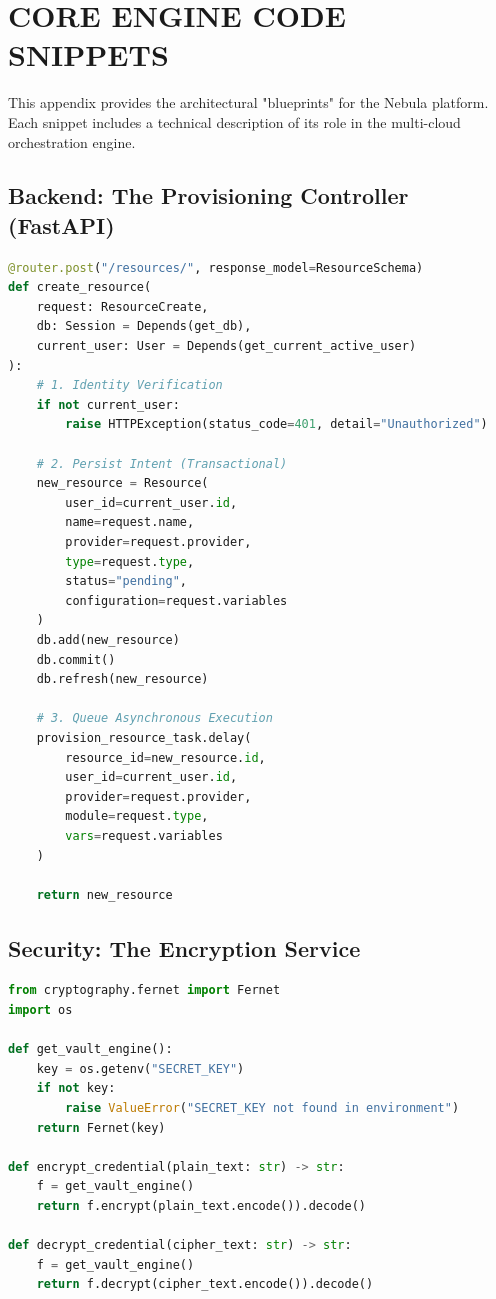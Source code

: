 \chapter{CORE ENGINE CODE SNIPPETS}

This appendix provides the architectural "blueprints" for the Nebula platform. Each snippet includes a technical description of its role in the multi-cloud orchestration engine.

\section{Backend: The Provisioning Controller (FastAPI)}
\begin{lstlisting}[language=Python, caption=Full Provisioning Router]
@router.post("/resources/", response_model=ResourceSchema)
def create_resource(
    request: ResourceCreate, 
    db: Session = Depends(get_db), 
    current_user: User = Depends(get_current_active_user)
):
    # 1. Identity Verification
    if not current_user:
        raise HTTPException(status_code=401, detail="Unauthorized")

    # 2. Persist Intent (Transactional)
    new_resource = Resource(
        user_id=current_user.id,
        name=request.name,
        provider=request.provider,
        type=request.type,
        status="pending",
        configuration=request.variables
    )
    db.add(new_resource)
    db.commit()
    db.refresh(new_resource)

    # 3. Queue Asynchronous Execution
    provision_resource_task.delay(
        resource_id=new_resource.id,
        user_id=current_user.id,
        provider=request.provider,
        module=request.type,
        vars=request.variables
    )
    
    return new_resource
\end{lstlisting}

\section{Security: The Encryption Service}
\begin{lstlisting}[language=Python, caption=AES-128 Fernet Implementation]
from cryptography.fernet import Fernet
import os

def get_vault_engine():
    key = os.getenv("SECRET_KEY")
    if not key:
        raise ValueError("SECRET_KEY not found in environment")
    return Fernet(key)

def encrypt_credential(plain_text: str) -> str:
    f = get_vault_engine()
    return f.encrypt(plain_text.encode()).decode()

def decrypt_credential(cipher_text: str) -> str:
    f = get_vault_engine()
    return f.decrypt(cipher_text.encode()).decode()
\end{lstlisting}

